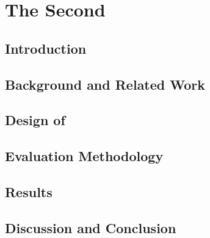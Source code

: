 
\chapter{The Second}


\section{Introduction}
\label{sec:ch2_intro}



\section{Background and Related Work}
\label{sec:ch2_bgreltool}


\section{Design of \parlot}
\label{sec:ch2_design}


\section{Evaluation Methodology}
\label{sec:ch2_evalmeth}


\section{Results}
\label{sec:ch2_results}


\section{Discussion and Conclusion}
\label{sec:ch2_concl}

